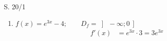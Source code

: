 \begin{Exercise}{S. 20/1}{}
\begin{enumerate}
\begin{enumerate}[label=\alph*)]
{                \begin{align*}
                    f'(x) &= 5 \cdot \ln(-x) + 5x \cdot \dfrac{1}{-x} \cdot (-1) = 5 \cdot \left[\ln(-x) + 1\right] &&\\[-2.0ex]
                \end{align*}
                }
            \item [f)] {
                $f(x) = e^{3x} - 4; \qquad D_{f} = \left] \ -\infty;  0 \ \right]$\\[-2.0ex]
                \begin{align*}
                    f'(x) &= e^{3x} \cdot 3 = 3e^{3x} &&\\[-2.0ex]
                \end{align*}
                }
        \end{enumerate}
    \end{enumerate}
\end{Exercise}

